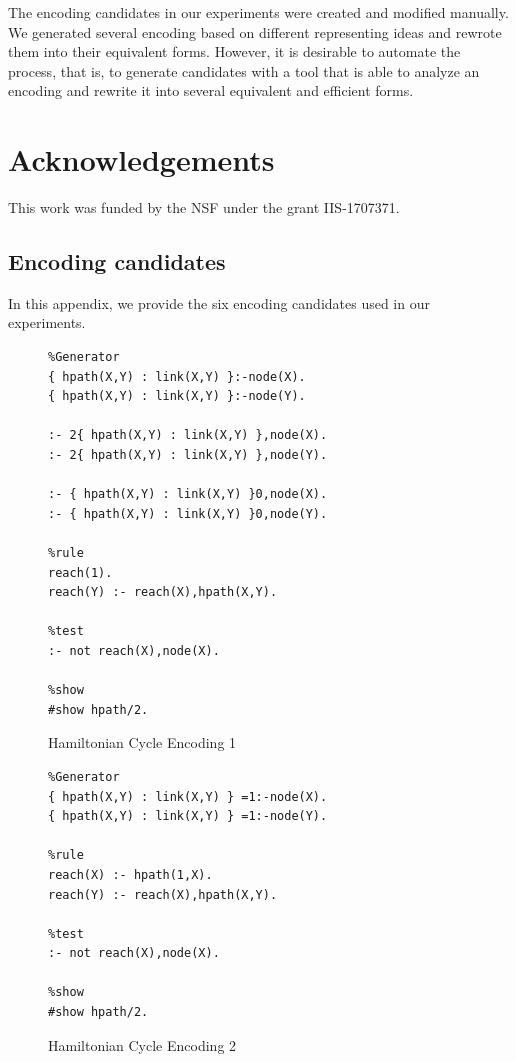 \documentclass{new_tlp}
\begin{document}
The encoding candidates in our experiments were created and modified manually. 
We generated several encoding based on different representing ideas and rewrote 
them into their equivalent forms. However, it is desirable to automate the 
process, that is, to generate candidates with a tool that is able to analyze 
an encoding and rewrite it into several equivalent and efficient forms. 

\section*{Acknowledgements}
This work was funded by the NSF under the grant IIS-1707371.
\newpage
\begin{appendices}
\section{Encoding candidates}
In this appendix, we provide the six encoding candidates used in our experiments.

\begin{figure}[h]
\figrule
\begin{center}
\begin{verbatim}
%Generator
{ hpath(X,Y) : link(X,Y) }:-node(X).
{ hpath(X,Y) : link(X,Y) }:-node(Y).

:- 2{ hpath(X,Y) : link(X,Y) },node(X).
:- 2{ hpath(X,Y) : link(X,Y) },node(Y).

:- { hpath(X,Y) : link(X,Y) }0,node(X).
:- { hpath(X,Y) : link(X,Y) }0,node(Y).

%rule
reach(1).
reach(Y) :- reach(X),hpath(X,Y).

%test
:- not reach(X),node(X).

%show
#show hpath/2.
\end{verbatim}
\end{center}
\caption{Hamiltonian Cycle Encoding 1}\label{reachencod}
\figrule
\end{figure}

\begin{figure}[h]
\figrule
\begin{center}
\begin{verbatim}
%Generator
{ hpath(X,Y) : link(X,Y) } =1:-node(X).
{ hpath(X,Y) : link(X,Y) } =1:-node(Y).

%rule
reach(X) :- hpath(1,X).
reach(Y) :- reach(X),hpath(X,Y).

%test
:- not reach(X),node(X).

%show
#show hpath/2.
\end{verbatim}
\end{center}
\caption{Hamiltonian Cycle Encoding 2}\label{reachencod}
\figrule
\end{figure}


\end{appendices}
\end{document}
